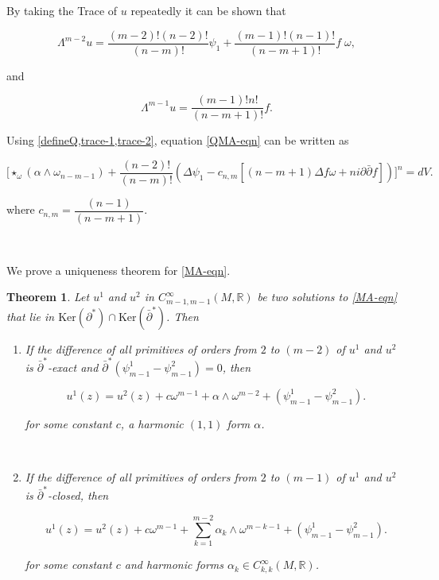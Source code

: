 \documentclass[11pt,letterpaper]{amsart}
\newcommand{\sbpartial}{\bar{\partial}^*}
\newcommand{\spartial}{\partial^*}
\newcommand{\pbp}{\partial \bar{\partial}}
\newcommand{\Ker}{\mbox{Ker}}
\newtheorem{theorem}{Theorem}[section]
\numberwithin{equation}{section}
\begin{document}
By taking the Trace of $u$ repeatedly it can be shown that 

\begin{equation}\label{trace-2}
    \Lambda^{m-2} u =\frac{(m-2)!(n-2)!}{(n-m)!} \psi_1 + \frac{(m-1)!(n-1)!}{(n-m+1)!} f \; \omega,
\end{equation}

\noindent and 

\begin{equation}\label{trace-1}
\Lambda^{m-1} u = \frac{(m-1)! n!}{(n-m+1)!}f.
\end{equation}

Using \cref{defineQ,trace-1,trace-2}, equation \eqref{QMA-eqn} can be written as

\begin{equation}\label{QMA-primitives}
    \Big[\star_{\omega}(\alpha\wedge \omega_{n-m-1}) + \frac{(n-2)!}{(n-m)!}\left(\Delta \psi_1 - c_{n,m}\left[(n-m+1)\Delta f \omega +  n i \pbp f \right]\right)\Big]^n = dV.
\end{equation}

\noindent where $c_{n,m} =\dfrac{(n-1)}{(n-m+1)}$. 


\

We prove a uniqueness theorem for \eqref{MA-eqn}.








\begin{theorem}\label{unique-thm}
Let $u^1$ and $u^2$ in $C_{m-1,m-1}^{\infty}(M, \mathbb R)$ be two solutions to \eqref{MA-eqn} that lie in $\Ker (\spartial) \cap \Ker( \bar{\partial}^*)$. Then

\begin{enumerate}
    \item If the difference of all primitives of orders from $2$ to $(m-2)$ of $u^1$ and $u^2$ is $\bar\partial^*$-exact and $\sbpartial(\psi^1_{m-1} - \psi_{m-1}^2) =0 $, then

$$u^1(z) = u^2(z) + c \omega^{m-1} + \alpha \wedge \omega^{m-2} +  (\psi^1_{m-1} - \psi_{m-1}^2).$$

\noindent for some constant $c$, a harmonic $(1,1)$ form $\alpha$.

\

\item If the difference of all primitives of orders from $2$ to $(m-1)$ of $u^1$ and $u^2$ is $\bar\partial^*$-closed, then

$$u^1(z) = u^2(z) + c \omega^{m-1} + \sum_{k=1}^{m-2} \alpha_k \wedge \omega^{m-k-1} + (\psi^1_{m-1} - \psi_{m-1}^2).$$

\noindent for some constant $c$ and harmonic forms $\alpha_k \in C^{\infty}_{k,k}(M, \mathbb R) $.
\end{enumerate}


\end{theorem}
\end{document}
